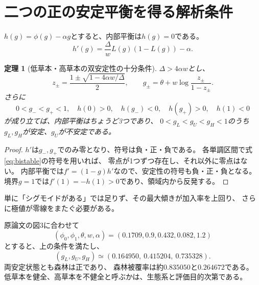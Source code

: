 \documentclass[a4paper,11pt]{ltjsarticle}
\newtheorem{theorem}[proposition]{定理}
\begin{document}
\section{二つの正の安定平衡を得る解析条件}
$h(g)=\phi(g)-\alpha g$とすると、内部平衡は$h(g)=0$である。
\[
 h'(g)=\frac{\Delta}{w}L(g)(1-L(g))-\alpha .
\]
\begin{theorem}[低草本・高草本の双安定性の十分条件]
$\Delta>4\alpha w$とし、
\begin{equation}
 z_\pm=\frac{1\pm\sqrt{1-4\alpha w/\Delta}}2,\qquad
 g_\pm=\theta+w\log\frac{z_\pm}{1-z_\pm}.
\end{equation}
さらに
\begin{equation}
 0<g_-<g_+<1,\quad h(0)>0,\quad
 h(g_-)<0,\quad h(g_+)>0,\quad h(1)<0\label{eq:bistable}
\end{equation}
が成り立てば、内部平衡はちょうど3つであり、
$0<g_L<g_U<g_H<1$のうち$g_L,g_H$が安定、$g_U$が不安定である。
\end{theorem}
\begin{proof}
$h'$は$g_-,g_+$でのみ零となり、符号は負・正・負である。
各単調区間で式\eqref{eq:bistable}の符号を用いれば、
零点が1つずつ存在し、それ以外に零点はない。
内部平衡では$f'=(1-g)h'$なので、安定性の符号も負・正・負となる。
境界$g=1$では$f'(1)=-h(1)>0$であり、領域内から反発する。
\end{proof}
単に「シグモイドがある」では足りず、その最大傾きが加入率を上回り、
さらに極値が零線をまたぐ必要がある。

原論文の図3に合わせて
\begin{equation}
 (\phi_0,\phi_1,\theta,w,\alpha)=(0.1709,0.9,0.432,0.082,1.2)
 \label{eq:baseline}
\end{equation}
とすると、上の条件を満たし、
\[
 (g_L,g_U,g_H)\simeq(0.164950,\ 0.415204,\ 0.735328).
\]
両安定状態とも森林は正であり、
森林被覆率は約$0.835050$と$0.264672$である。
低草本を健全、高草本を不健全と呼ぶかは、生態系と評価目的次第である。
\end{document}
